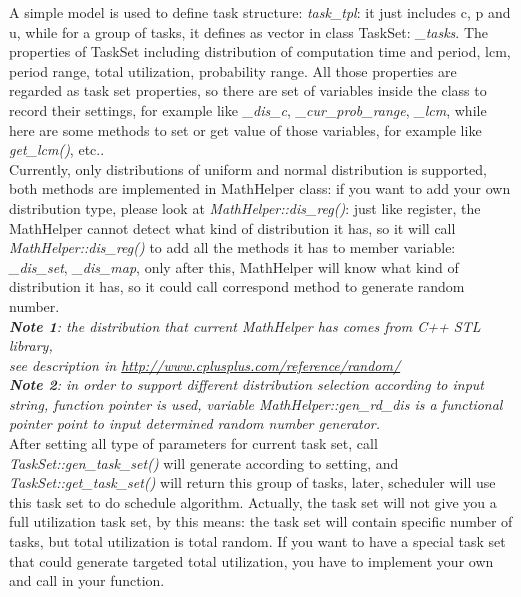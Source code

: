 \documentclass[11pt, oneside]{article}
\begin{document}
A simple model is used to define task structure: \textit{task\_tpl}: it just includes c, p and u, while for a group of tasks, it defines as vector in class TaskSet: \textit{\_tasks}. The properties of TaskSet including distribution of computation time and period, lcm, period range, total utilization, probability range. All those properties are regarded as task set properties, so there are set of variables inside the class to record their settings, for example like \textit{\_dis\_c}, \textit{\_cur\_prob\_range}, \textit{\_lcm}, while here are some methods to set or get value of those variables, for example like \textit{get\_lcm()}, etc.. \\

Currently, only distributions of uniform and normal distribution is supported, both methods are implemented in MathHelper class: if you want to add your own distribution type, please look at \textit{MathHelper::dis\_reg()}: just like register, the MathHelper cannot detect what kind of distribution it has, so it will call \textit{MathHelper::dis\_reg()} to add all the methods it has to member variable: \textit{\_dis\_set}, \textit{\_dis\_map}, only after this, MathHelper will know what kind of distribution it has, so it could call correspond method to generate random number. \\

\textit{\textbf{Note 1}: the distribution that current MathHelper has comes from C++ STL library, \\see description in \underline{http://www.cplusplus.com/reference/random/}}\\
\textit{\textbf{Note 2}: in order to support different distribution selection according to input string, function pointer is used, variable \textit{MathHelper::gen\_rd\_dis} is a functional pointer point to input determined random number generator. }\\

After setting all type of parameters for current task set, call \textit{TaskSet::gen\_task\_set()} will generate according to setting, and \textit{TaskSet::get\_task\_set()} will return this group of tasks, later, scheduler will use this task set to do schedule algorithm. Actually, the task set will not give you a full utilization task set, by this means: the task set will contain specific number of tasks, but total utilization is total random. If you want to have a special task set that could generate targeted total utilization, you have to implement your own and call in your function.
\end{document}
